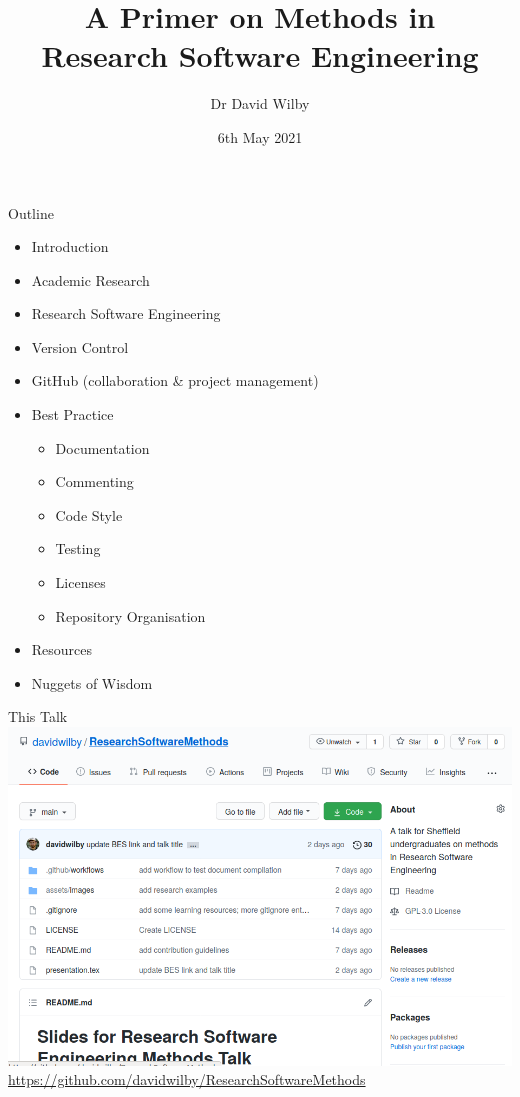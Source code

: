 \documentclass{beamer} %
\title{A Primer on Methods in \\Research Software Engineering}
\date{6th May 2021}
\author{Dr David Wilby}
\institute{Research Software Engineering Team,\\ The University of Sheffield}
\begin{document}
  \begin{frame}
    \titlepage
  \end{frame}

  \begin{frame}{Outline}
    \begin{itemize}
      \item Introduction
      \item Academic Research
      \item Research Software Engineering
      \item Version Control
      \item GitHub (collaboration \& project management)
      \item Best Practice
      \begin{itemize}
        \item Documentation
        \item Commenting
        \item Code Style
        \item Testing
        \item Licenses
        \item Repository Organisation
      \end{itemize}
      \item Resources
      \item Nuggets of Wisdom
    \end{itemize}
  \end{frame}

  \begin{frame}{This Talk}
    \href{https://github.com/davidwilby/ResearchSoftwareMethods}{\includegraphics[width=\textwidth]{talk_repo_screenshot.png}}
    \url{https://github.com/davidwilby/ResearchSoftwareMethods}
  \end{frame}
\end{document}
